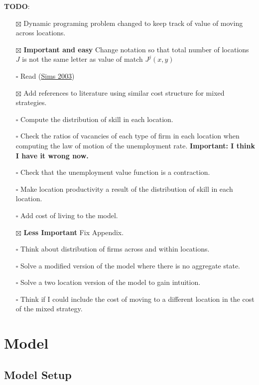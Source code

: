 \documentclass[
  letterpaper,
  DIV=11,
  numbers=noendperiod]{scrreprt}
\providecommand{\tightlist}{%
  \setlength{\itemsep}{0pt}\setlength{\parskip}{0pt}}\usepackage{longtable,booktabs,array}
\begin{document}
\textbf{TODO}:

\begin{itemize}
\tightlist
\item[$\boxtimes$]
  Dynamic programing problem changed to keep track of value of moving
  across locations.
\item[$\boxtimes$]
  \textbf{Important and easy} Change notation so that total number of
  locations \(J\) is not the same letter as value of match \(J^j(x,y)\)
\item[$\square$]
  Read
  (\protect\hyperlink{ref-simsImplicationsRationalInattention2003}{Sims
  2003})
\item[$\boxtimes$]
  Add references to literature using similar cost structure for mixed
  strategies.
\item[$\square$]
  Compute the distribution of skill in each location.
\item[$\square$]
  Check the ratios of vacancies of each type of firm in each location
  when computing the law of motion of the unemployment rate.
  {\textbf{Important: I think I have it wrong now.}}
\item[$\square$]
  Check that the unemployment value function is a contraction.
\item[$\square$]
  Make location productivity a result of the distribution of skill in
  each location.
\item[$\square$]
  Add cost of living to the model.
\item[$\boxtimes$]
  \textbf{Less Important} Fix Appendix.
\item[$\square$]
  Think about distribution of firms across and within locations.
\item[$\square$]
  Solve a modified version of the model where there is no aggregate
  state.
\item[$\square$]
  Solve a two location version of the model to gain intuition.
\item[$\square$]
  Think if I could include the cost of moving to a different location in
  the cost of the mixed strategy.
\end{itemize}


\hypertarget{model}{%
\chapter{Model}\label{model}}

\hypertarget{model-setup}{%
\section{Model Setup}\label{model-setup}}
\end{document}
